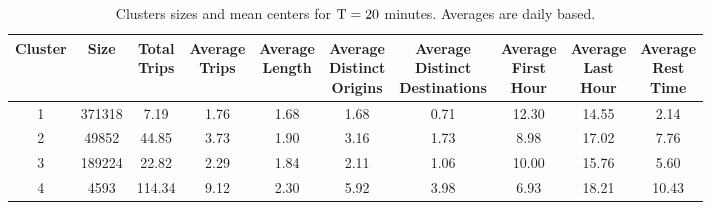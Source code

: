 \begin{table*}[t]
\centering
\small
\begin{tabular}{c c c c c c c c c c}
  \hline
 Cluster &  Size & \thead{Total\\Trips} & \thead{Average\\Trips} & \thead{Average\\Length} & \thead{Average\\Distinct\\Origins} & \thead{Average\\Distinct\\Destinations} & \thead{Average\\First\\Hour} & \thead{Average\\Last\\Hour} & \thead{Average\\Rest\\Time} \\
  \hline
  1 & 371318 & 7.19 & 1.76 & 1.68 & 1.68 & 0.71 & 12.30 & 14.55 & 2.14 \\
    2 & 49852 & 44.85 & 3.73 & 1.90 & 3.16 & 1.73 & 8.98 & 17.02 & 7.76 \\
    3 & 189224 & 22.82 & 2.29 & 1.84 & 2.11 & 1.06 & 10.00 & 15.76 & 5.60 \\
    4 & 4593 & 114.34 & 9.12 & 2.30 & 5.92 & 3.98 & 6.93 & 18.21 & 10.43 \\
   \hline
\end{tabular}
\caption{Clusters sizes and mean centers for $\mathrm{T} = 20$ minutes. Averages are daily based.}
\label{t:kmeans_centers_900}
\end{table*}
